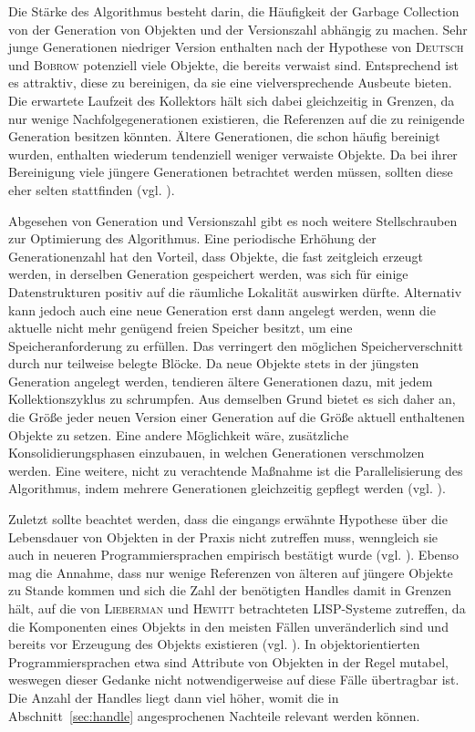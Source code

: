 \newpage

Die Stärke des Algorithmus besteht darin, die Häufigkeit der Garbage Collection von der Generation von Objekten und der Versionszahl abhängig zu machen.
Sehr junge Generationen niedriger Version enthalten nach der Hypothese von \textsc{Deutsch} und \textsc{Bobrow} potenziell viele Objekte, die bereits verwaist sind.
Entsprechend ist es attraktiv, diese zu bereinigen, da sie eine vielversprechende Ausbeute bieten.
Die erwartete Laufzeit des Kollektors hält sich dabei gleichzeitig in Grenzen, da nur wenige Nachfolgegenerationen existieren, die Referenzen auf die zu reinigende Generation besitzen könnten.
Ältere Generationen, die schon häufig bereinigt wurden, enthalten wiederum tendenziell weniger verwaiste Objekte.
Da bei ihrer Bereinigung viele jüngere Generationen betrachtet werden müssen, sollten diese eher selten stattfinden (vgl. \cite[S. 423]{lieberman1983}).

Abgesehen von Generation und Versionszahl gibt es noch weitere Stellschrauben zur Optimierung des Algorithmus.
Eine periodische Erhöhung der Generationenzahl hat den Vorteil, dass Objekte, die fast zeitgleich erzeugt werden, in derselben Generation gespeichert werden, was sich für einige Datenstrukturen positiv auf die räumliche Lokalität auswirken dürfte.
Alternativ kann jedoch auch eine neue Generation erst dann angelegt werden, wenn die aktuelle nicht mehr genügend freien Speicher besitzt, um eine Speicheranforderung zu erfüllen.
Das verringert den möglichen Speicherverschnitt durch nur teilweise belegte Blöcke.
Da neue Objekte stets in der jüngsten Generation angelegt werden, tendieren ältere Generationen dazu, mit jedem Kollektionszyklus zu schrumpfen.
Aus demselben Grund bietet es sich daher an, die Größe jeder neuen Version einer Generation auf die Größe aktuell enthaltenen Objekte zu setzen.
Eine andere Möglichkeit wäre, zusätzliche Konsolidierungsphasen einzubauen, in welchen Generationen verschmolzen werden.
Eine weitere, nicht zu verachtende Maßnahme ist die Parallelisierung des Algorithmus, indem mehrere Generationen gleichzeitig gepflegt werden (vgl. \cite[S. 426]{lieberman1983}).

Zuletzt sollte beachtet werden, dass die eingangs erwähnte Hypothese über die Lebensdauer von Objekten in der Praxis nicht zutreffen muss, wenngleich sie auch in neueren Programmiersprachen empirisch bestätigt wurde (vgl. \cite{jones2008}).
Ebenso mag die Annahme, dass nur wenige Referenzen von älteren auf jüngere Objekte zu Stande kommen und sich die Zahl der benötigten Handles damit in Grenzen hält, auf die von \textsc{Lieberman} und \textsc{Hewitt} betrachteten LISP-Systeme zutreffen, da die Komponenten eines Objekts in den meisten Fällen unveränderlich sind und bereits vor Erzeugung des Objekts existieren (vgl. \cite[S. 422]{lieberman1983}).
In objektorientierten Programmiersprachen etwa sind Attribute von Objekten in der Regel mutabel, weswegen dieser Gedanke nicht notwendigerweise auf diese Fälle übertragbar ist.
Die Anzahl der Handles liegt dann viel höher, womit die in Abschnitt~\ref{sec:handle} angesprochenen Nachteile relevant werden können.


